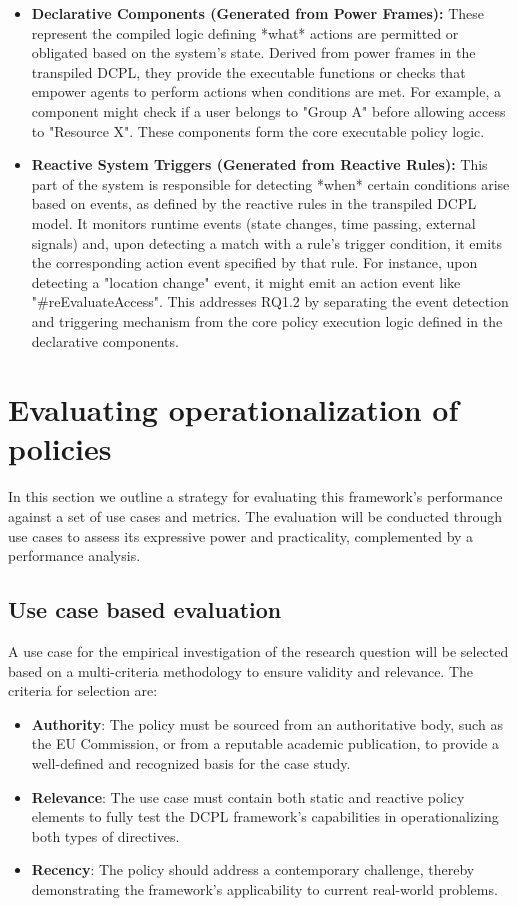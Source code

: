 \begin{itemize}
    \item \textbf{Declarative Components (Generated from Power Frames):} These represent the compiled logic defining *what* actions are permitted or obligated based on the system's state. Derived from power frames in the transpiled DCPL, they provide the executable functions or checks that empower agents to perform actions when conditions are met. For example, a component might check if a user belongs to "Group A" before allowing access to "Resource X". These components form the core executable policy logic.

    \item \textbf{Reactive System Triggers (Generated from Reactive Rules):} This part of the system is responsible for detecting *when* certain conditions arise based on events, as defined by the reactive rules in the transpiled DCPL model. It monitors runtime events (state changes, time passing, external signals) and, upon detecting a match with a rule's trigger condition, it emits the corresponding action event specified by that rule. For instance, upon detecting a "location change" event, it might emit an action event like "\#reEvaluateAccess". This addresses RQ1.2 by separating the event detection and triggering mechanism from the core policy execution logic defined in the declarative components.
\end{itemize}


\section{Evaluating operationalization of policies} \label{sec:evaluating}

In this section we outline a strategy for evaluating this framework's performance against a set of use cases and metrics. The evaluation will be conducted through use cases to assess its expressive power and practicality, complemented by a performance analysis.

\subsection{Use case based evaluation}

A use case for the empirical investigation of the research question will be selected based on a multi-criteria methodology to ensure validity and relevance. The criteria for selection are:

\begin{itemize}
\item \textbf{Authority}: The policy must be sourced from an authoritative body, such as the EU Commission, or from a reputable academic publication, to provide a well-defined and recognized basis for the case study.
\item \textbf{Relevance}: The use case must contain both static and reactive policy elements to fully test the DCPL framework's capabilities in operationalizing both types of directives.
\item \textbf{Recency}: The policy should address a contemporary challenge, thereby demonstrating the framework's applicability to current real-world problems.
\end{itemize}

